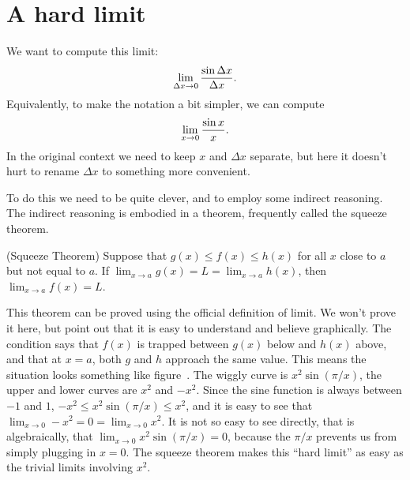 \section{A hard limit}{}{}
\nobreak
We want to compute this limit:
$$\lim_{\Delta x\to0} {\sin\Delta x\over \Delta x}.$$
Equivalently, to make the notation a bit simpler, we can compute
$$\lim_{x\to0} {\sin x\over x}.$$
In the original context we need to keep $x$ and $\Delta x$ separate,
but here it doesn't hurt to rename $\Delta x$ to something more
convenient. 

To do this we
need to be quite clever, and to employ some indirect reasoning. The
indirect reasoning is embodied in a theorem, frequently called the
{\dfont squeeze theorem.}

\begin{theorem} (Squeeze Theorem)
Suppose that $g(x) \le f(x) \le h(x)$ for all $x$ close to $a$ but not
equal to $a$. If $\lim_{x\to a}g(x)=L=\lim_{x
\to a}h(x)$, then $\lim_{x\to a}f(x)=L$.
\label{thm:squeeze theorem}
\end{theorem}

This theorem can be proved using the official definition of limit. We
won't prove it here, but point out that it is easy to understand and
believe graphically. The condition says that $f(x)$ is trapped between
$g(x)$ below and $h(x)$ above, and that at $x=a$, both $g$ and $h$
approach the same value. This means the situation looks something like
figure~. The wiggly curve is $x^2\sin(\pi/x)$, the
upper and lower curves are $x^2$ and $-x^2$. Since the sine function
is always between $-1$ and $1$, $-x^2\le x^2\sin(\pi/x)\le x^2$, and
it is easy to see that $\lim_{x\to0}-x^2=0=\lim_{x\to0}x^2$.
It is not so easy to see directly, that is algebraically, that 
$\lim_{x\to0}x^2\sin(\pi/x)=0$, because the $\pi/x$ prevents us from
simply plugging in $x=0$. The squeeze theorem makes this ``hard
limit'' as easy as the trivial limits involving $x^2$.

